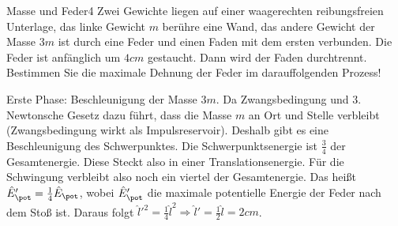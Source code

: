 \begin{problem}{Masse und Feder}{4}
  Zwei Gewichte liegen auf einer waagerechten reibungsfreien Unterlage, das linke Gewicht $m$ berühre eine Wand, das andere Gewicht der Masse $3m$ ist durch eine Feder und einen Faden mit dem ersten verbunden.  Die Feder ist anfänglich um $4\unit{cm}$ gestaucht.  Dann wird der Faden durchtrennt.  Bestimmen Sie die maximale Dehnung der Feder im darauffolgenden Prozess!
  \begin{solution}
    Erste Phase:  Beschleunigung der Masse $3m$.  Da Zwangsbedingung und 3. Newtonsche Gesetz dazu führt, dass die Masse $m$ an Ort und Stelle verbleibt (Zwangsbedingung wirkt als Impulsreservoir).  Deshalb gibt es eine Beschleunigung des Schwerpunktes.  Die Schwerpunktsenergie ist $\frac 34$ der Gesamtenergie.  Diese Steckt also in einer Translationsenergie.  Für die Schwingung verbleibt also noch ein viertel der Gesamtenergie.  Das heißt $\hat{E}_{\pot}'=\frac 14\hat{E}_{\pot}$, wobei $\hat{E}_\pot'$ die maximale potentielle Energie der Feder nach dem Stoß ist.  Daraus folgt $\hat{l}'^2=\frac 14\hat{l}^2\Rightarrow \hat{l}'=\frac 12 \hat l=2\unit{cm}$.
  \end{solution}
\end{problem}

